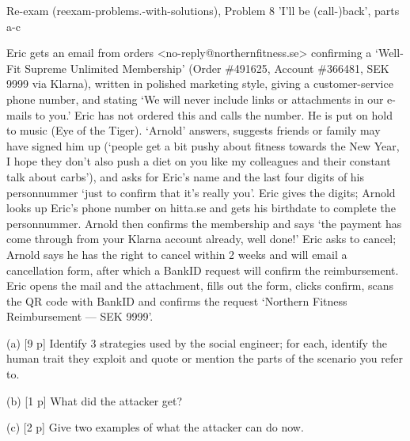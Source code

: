 \documentclass[12pt, a4paper]{article}
\begin{document}
\begin{practicebox}{Re-exam (reexam-problems.-with-solutions), Problem 8 'I'll be (call-)back', parts a-c}
\begin{problembox}
Eric gets an email from orders <no-reply@northernfitness.se> confirming a `Well-Fit Supreme Unlimited Membership' (Order \#491625, Account \#366481, SEK 9999 via Klarna), written in polished marketing style, giving a customer-service phone number, and stating `We will never include links or attachments in our e-mails to you.' Eric has not ordered this and calls the number. He is put on hold to music (Eye of the Tiger). `Arnold' answers, suggests friends or family may have signed him up (`people get a bit pushy about fitness towards the New Year, I hope they don't also push a diet on you like my colleagues and their constant talk about carbs'), and asks for Eric's name and the last four digits of his personnummer `just to confirm that it's really you'. Eric gives the digits; Arnold looks up Eric's phone number on hitta.se and gets his birthdate to complete the personnummer. Arnold then confirms the membership and says `the payment has come through from your Klarna account already, well done!' Eric asks to cancel; Arnold says he has the right to cancel within 2 weeks and will email a cancellation form, after which a BankID request will confirm the reimbursement. Eric opens the mail and the attachment, fills out the form, clicks confirm, scans the QR code with BankID and confirms the request `Northern Fitness Reimbursement --- SEK 9999'.

(a) [9 p] Identify 3 strategies used by the social engineer; for each, identify the human trait they exploit and quote or mention the parts of the scenario you refer to.

(b) [1 p] What did the attacker get?

(c) [2 p] Give two examples of what the attacker can do now.
\end{problembox}


\end{practicebox}
\end{document}
